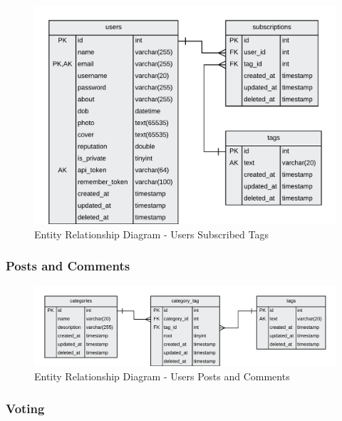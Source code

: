 \begin{figure}[H]
  \centering
  \includegraphics[width=1.0\textwidth]{Images/Design/Database/Subscriptions}
  \caption{Entity Relationship Diagram - Users Subscribed Tags} \label{fig:ERD_Subscriptions}
\end{figure}

\subsubsection{Posts and Comments}

\begin{figure}[H]
  \centering
  \includegraphics[width=1.0\textwidth]{Images/Design/Database/Categories}
  \caption{Entity Relationship Diagram - Users Posts and Comments} \label{fig:ERD_Posts}
\end{figure}

\subsubsection{Voting}

